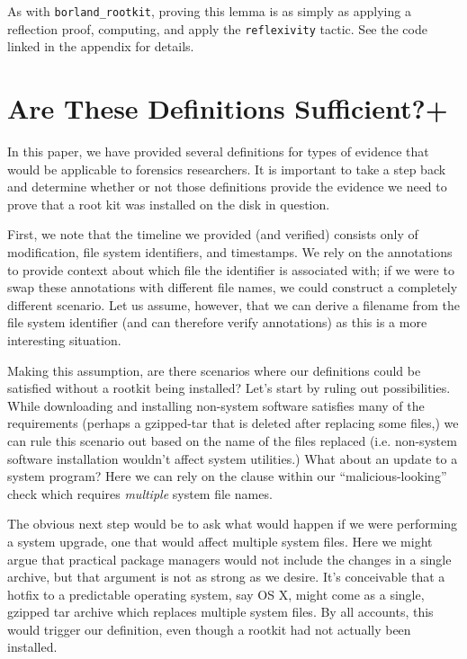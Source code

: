 \documentclass[nocopyrightspace]{sigplanconf}
\begin{document}
As with {\tt borland\_rootkit}, proving this lemma is as simply as applying a
reflection proof, computing, and apply the {\tt reflexivity} tactic. See the
code linked in the appendix for details.


\section{Are These Definitions Sufficient?+}
\label{sec:sufficient}

In this paper, we have provided several definitions for types of evidence that
would be applicable to forensics researchers. It is important to take a step
back and determine whether or not those definitions provide the evidence we
need to prove that a root kit was installed on the disk in question. 

First, we note that the timeline we provided (and verified) consists only of
modification, file system identifiers, and timestamps. We rely on the
annotations to provide context about which file the identifier is associated
with; if we were to swap these annotations with different file names, we could
construct a completely different scenario. Let us assume, however, that we can
derive a filename from the file system identifier (and can therefore verify
annotations) as this is a more interesting situation.

Making this assumption, are there scenarios where our definitions could be
satisfied without a rootkit being installed? Let's start by ruling out
possibilities. While downloading and installing non-system software satisfies
many of the requirements (perhaps a gzipped-tar that is deleted after
replacing some files,) we can rule this scenario out based on the name of the
files replaced (i.e. non-system software installation wouldn't affect system
utilities.) What about an update to a system program? Here we can rely on the
clause within our ``malicious-looking'' check which requires {\em multiple}
system file names.

The obvious next step would be to ask what would happen if we were performing
a system upgrade, one that would affect multiple system files. Here we might
argue that practical package managers would not include the changes in a
single archive, but that argument is not as strong as we desire. It's
conceivable that a hotfix to a predictable operating system, say OS X, might
come as a single, gzipped tar archive which replaces multiple system files. By
all accounts, this would trigger our definition, even though a rootkit had
not actually been installed.
\end{document}
